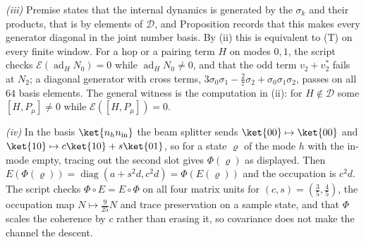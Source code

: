 \emph{(iii)} Premise  states that the internal dynamics is generated by the $\sigma_{k}$ and their products, that is by elements of $\mathcal{D}$, and Proposition  records that this makes every generator diagonal in the joint number basis. By (ii) this is equivalent to (T) on every finite window. For a hop or a pairing term $H$ on modes $0, 1$, the script checks $\mathcal{E}(\operatorname{ad}_{H}N_{0}) = 0$ while $\operatorname{ad}_{H}N_{0} \neq 0$, and that the odd term $v_{2} + v_{2}^{*}$ fails at $N_{2}$; a diagonal generator with cross terms, $3\sigma_{0}\sigma_{1} - \tfrac27\sigma_{2} + \sigma_{0}\sigma_{1}\sigma_{2}$, passes on all $64$ basis elements. The general witness is the computation in (ii): for $H \notin \mathcal{D}$ some $[H, P_{\mu}] \neq 0$ while $\mathcal{E}([H, P_{\mu}]) = 0$.

\emph{(iv)} In the basis $\ket{n_{h}n_{\mathrm{in}}}$ the beam splitter sends $\ket{00} \mapsto \ket{00}$ and $\ket{10} \mapsto c\ket{10} + s\ket{01}$, so for a state $\varrho$ of the mode $h$ with the in-mode empty, tracing out the second slot gives $\Phi(\varrho)$ as displayed. Then $E(\Phi(\varrho)) = \operatorname{diag}(a + s^{2}d, c^{2}d) = \Phi(E(\varrho))$ and the occupation is $c^{2}d$. The script checks $\Phi\circ E = E\circ\Phi$ on all four matrix units for $(c, s) = (\tfrac35, \tfrac45)$, the occupation map $N \mapsto \tfrac{9}{25}N$ and trace preservation on a sample state, and that $\Phi$ scales the coherence by $c$ rather than erasing it, so covariance does not make the channel the descent.
